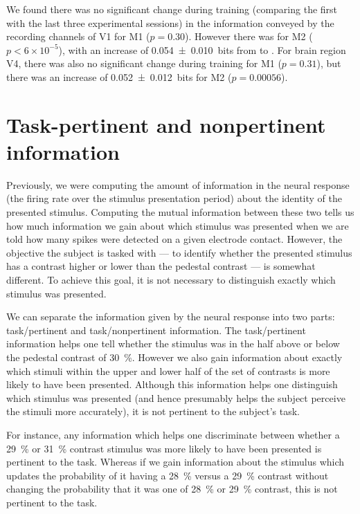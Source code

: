 We found there was no significant change during training (comparing the first with the last three experimental sessions) in the information conveyed by the recording channels of \ac{V1} for \ac{M1} ($p=0.30$).
However there was for \ac{M2} ($p < 6 \times 10^{-5}$), with an increase of \SI{+0.054\pm0.010}{bits} from  to .
For brain region \ac{V4}, there was also no significant change during training for \ac{M1} ($p=0.31$), but there was an increase of \SI{+0.052\pm0.012}{bits} for \ac{M2} ($p=0.00056$).


\section{Task-pertinent and nonpertinent information}
\label{sec:task-info}

Previously, we were computing the amount of information in the neural response (the firing rate over the stimulus presentation period) about the identity of the presented stimulus.
Computing the mutual information between these two tells us how much information we gain about which stimulus was presented when we are told how many spikes were detected on a given electrode contact.
However, the objective the subject is tasked with --- to identify whether the presented stimulus has a contrast higher or lower than the pedestal contrast --- is somewhat different.
To achieve this goal, it is not necessary to distinguish exactly which stimulus was presented.

We can separate the information given by the neural response into two parts: task\-/pertinent and task\-/nonpertinent information.
The task\-/pertinent information helps one tell whether the stimulus was in the half above or below the pedestal contrast of \SI{30}{\percent}.
However we also gain information about exactly which stimuli within the upper and lower half of the set of contrasts is more likely to have been presented.
Although this information helps one distinguish which stimulus was presented (and hence presumably helps the subject perceive the stimuli more accurately), it is not pertinent to the subject's task.

For instance, any information which helps one discriminate between whether a \SI{29}{\percent} or \SI{31}{\percent} contrast stimulus was more likely to have been presented is pertinent to the task.
Whereas if we gain information about the stimulus which updates the probability of it having a \SI{28}{\percent} versus a \SI{29}{\percent} contrast without changing the probability that it was one of \SI{28}{\percent} or \SI{29}{\percent} contrast, this is not pertinent to the task.

